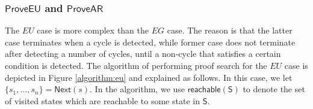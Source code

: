 \subsubsection{$\mathsf{ProveEU}$ and $\mathsf{ProveAR}$}
The $EU$ case is more complex than the $EG$ case. The reason is that the latter case terminates when a cycle is detected, while former case does not terminate after detecting a number of cycles, until a non-cycle that satisfies a certain condition is detected. The algorithm of performing proof search for the $EU$ case is depicted in Figure \ref{algorithm:eu} and explained as follows. 
In this case, we let $\{s_1,...,s_n\}=\textsf{Next}(s)$.
In the algorithm, we use $\mathsf{reachable(S)}$ to denote the set of visited states which are reachable to some state in $\mathsf{S}$.
